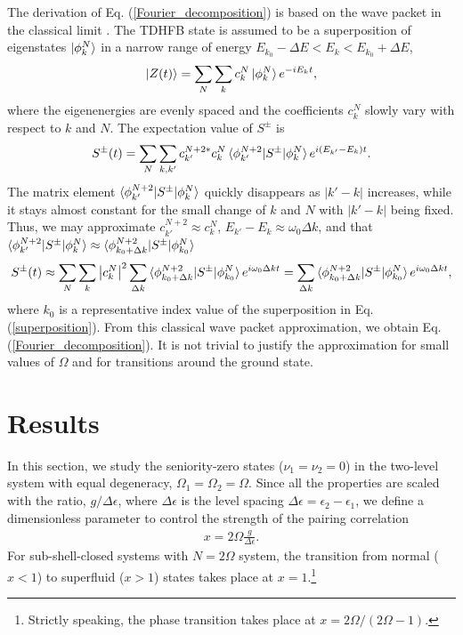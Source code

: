 \documentclass[%
superscriptaddress,
preprint,
showpacs,
nofootinbib,
amsmath,amssymb,
aps,
prc,
floatfix ]%
{revtex4-1}
\begin{document}
The derivation  of Eq. (\ref{Fourier_decomposition})
is based on the wave packet in the
classical limit \cite{LL65}.
The TDHFB state is assumed to be a superposition of eigenstates $\ket{\phi_k^N}$
in a narrow range of energy $E_{k_0}-\Delta E<E_k<E_{k_0}+\Delta E$,
\begin{equation}
	\ket{Z(t)} = \sum_N \sum_k c_k^N \ket{\phi_k^N} e^{-iE_k t} ,
	\label{superposition}
\end{equation}
where the eigenenergies are evenly spaced and
the coefficients $c_k^N$ slowly vary with respect to $k$ and $N$.
The expectation value of $S^\pm$ is
\begin{equation}
	S^\pm(t) = \sum_{N} \sum_{k,k'} c_{k'}^{N+2*} c_k^N 
	\braket{\phi_{k'}^{N+2}|S^\pm|\phi_k^N} e^{i(E_{k'}-E_k)t} .
\end{equation}
The matrix element $\braket{\phi_{k'}^{N+2}|S^\pm|\phi_k^N}$
quickly disappears as $|k'-k|$ increases, while it stays almost constant
for the small change of $k$ and $N$ with $|k'-k|$ being fixed.
Thus, we may approximate $c_{k'}^{N+2}\approx c_k^N$,
$E_{k'}-E_k\approx \omega_0 \Delta k$, and
that $\braket{\phi_{k'}^{N+2}|S^\pm|\phi_k^N}\approx
\braket{\phi_{k_0+\Delta k}^{N+2}|S^\pm|\phi_{k_0}^N}$ 
\begin{equation}
	S^\pm(t) \approx \sum_{N} \sum_{k} \left|c_k^N\right|^2
	\sum_{\Delta k}
	\braket{\phi_{k_0+\Delta k}^{N+2}|S^\pm|\phi_{k_0}^N}
	e^{i\omega_0 \Delta k t} 
	= \sum_{\Delta k}
	\braket{\phi_{k_0+\Delta k}^{N+2}|S^\pm|\phi_{k_0}^N}
	e^{i\omega_0 \Delta k t}  ,
\end{equation}
where $k_0$ is a representative index value of the superposition in 
Eq. (\ref{superposition}).
From this classical wave packet approximation,
we obtain Eq. (\ref{Fourier_decomposition}).
It is not trivial to justify the approximation for small values of $\Omega$
and for transitions around the ground state.






\section{Results}
\label{sec:results}

In this section, we study the seniority-zero states ($\nu_1=\nu_2=0$) in
the two-level system with equal degeneracy, $\Omega_1=\Omega_2=\Omega$.
Since all the properties are scaled with the ratio, $g/\Delta\epsilon$,
where $\Delta\epsilon$ is the level spacing
$\Delta\epsilon=\epsilon_2-\epsilon_1$,
we define a dimensionless parameter to control the strength of
the pairing correlation
\begin{align}
  x = 2\Omega\frac{g}{\Delta\epsilon} .
\label{x}
\end{align}
For sub-shell-closed systems with $N=2\Omega$ system,
the transition from normal ($x<1$) to superfluid ($x>1$) states
takes place at $x=1$.\footnote{
Strictly speaking, the phase transition takes place at $x=2\Omega/(2\Omega-1)$. }
\end{document}
